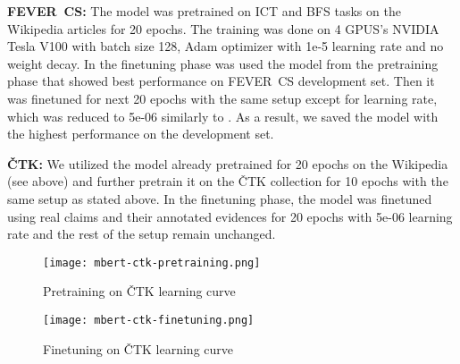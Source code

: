     \noindent \textbf{FEVER~CS:} The model was pretrained on ICT and BFS tasks on the Wikipedia articles for 20 epochs. The training was done on 4 GPUS's NVIDIA Tesla V100 with batch size 128, Adam optimizer with 1e-5 learning rate and no weight decay.
    In the finetuning phase was used the model from the pretraining phase that showed best performance on FEVER~CS development set. Then it was finetuned for next 20 epochs with the same setup except for learning rate, which was reduced to 5e-06 similarly to \parencite{chang2020twotower}. As a result, we saved the model with the highest performance on the development set.
    
    \noindent \textbf{ČTK:} We utilized the model already pretrained for 20 epochs on the Wikipedia (see above) and further pretrain it on the ČTK collection for 10 epochs with the same setup as stated above.
    In the finetuning phase, the model was finetuned using real claims and their annotated evidences for 20 epochs with 5e-06 learning rate and the rest of the setup remain unchanged.
    
    \begin{figure}[H]
        \texttt{[image: mbert-ctk-pretraining.png]}
        \centering
        \caption{Pretraining on ČTK learning curve}
        \label{fig:ctk-pretraining-lrcurve}
    \end{figure}
    
    \begin{figure}[H]
        \texttt{[image: mbert-ctk-finetuning.png]}
        \centering
        \caption{Finetuning on ČTK learning curve}
        \label{fig:ctk-finetuning-lrcurve}
    \end{figure}
    
